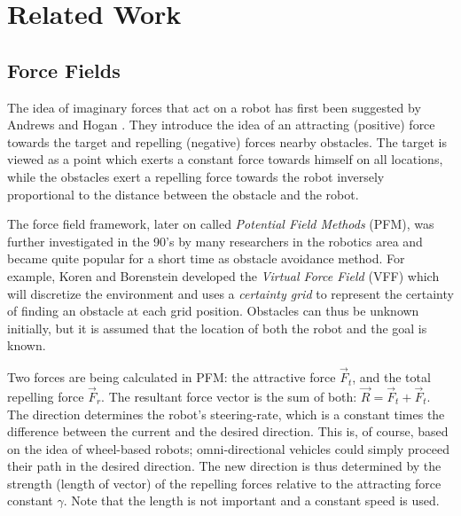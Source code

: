 \documentclass[11pt]{article}
\begin{document}
\section{Related Work}
\label{sec:related}

\subsection{Force Fields}

The idea of imaginary forces that act on a robot has first been suggested by Andrews and Hogan \cite{andrews83}. They introduce the idea of an attracting (positive) force towards the target and repelling (negative) forces nearby obstacles. The target is viewed as a point which exerts a constant force towards himself on all locations, while the obstacles exert a repelling force towards the robot inversely proportional to the distance between the obstacle and the robot.


The force field framework, later on called \emph{Potential Field Methods} (PFM), was further investigated in the 90's by many researchers in the robotics area and became quite popular for a short time as obstacle avoidance method. For example, Koren and Borenstein \cite{koren89} developed the \emph{Virtual Force Field} (VFF) which will discretize the environment and uses a \emph{certainty grid} to represent the certainty of finding an obstacle at each grid position. Obstacles can thus be unknown initially, but it is assumed that the location of both the robot and the goal is known.

Two forces are being calculated in PFM: the attractive force $\vec{F}_t$, and the total repelling force $\vec{F}_r$. The resultant force vector is the sum of both: $\vec{R} = \vec{F}_t + \vec{F}_t$. The direction determines the robot's steering-rate, which is a constant times the difference between the current and the desired direction. This is, of course, based on the idea of wheel-based robots; omni-directional vehicles could simply proceed their path in the desired direction. The new direction is thus determined by the strength (length of vector) of the repelling forces relative to the attracting force constant $\gamma$. Note that the length is not important and a constant speed is used.
\end{document}
